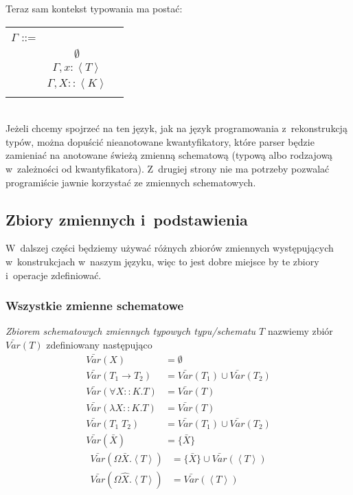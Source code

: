 \documentclass[11pt,leqno]{article}
\begin{document}
Teraz sam kontekst typowania ma postać:

\begin{tabular}{| l c r |}
  \hline
  $\Gamma$ ::= &  & \\
   & $\emptyset$ & \\
   & $\Gamma, x:\left<T\right>$ & \\
   & $\Gamma, X::\left<K\right>$ & \\
   & & \\
  \hline
\end{tabular} \\

Jeżeli chcemy spojrzeć na ten język, jak na język programowania z~rekonstrukcją typów, można
dopuścić nieanotowane kwantyfikatory, które parser będzie zamieniać na anotowane świeżą zmienną schematową 
(typową albo rodzajową w~zależności od kwantyfikatora). Z~drugiej strony nie ma potrzeby pozwalać programiście
jawnie korzystać ze zmiennych schematowych.

\subsection{Zbiory zmiennych i~podstawienia}

W~dalszej części będziemy używać różnych zbiorów zmiennych występujących w~konstrukcjach w~naszym języku, więc
to jest dobre miejsce by te zbiory i~operacje zdefiniować.

\subsubsection{Wszystkie zmienne schematowe}

\begin{definicja}
\emph{Zbiorem schematowych zmiennych typowych typu/schematu $T$} nazwiemy zbiór $\bar{Var}(T)$ zdefiniowany następująco
\begin{align*}
\bar{Var}(X) & = \emptyset \\
\bar{Var}(T_1 \to T_2) & = \bar{Var}(T_1) \cup \bar{Var}(T_2) \\
\bar{Var}(\forall X :: K.T) & = \bar{Var}(T) \\
\bar{Var}(\lambda X :: K.T) & = \bar{Var}(T) \\
\bar{Var}(T_1 \; T_2) & = \bar{Var}(T_1) \cup \bar{Var}(T_2) \\
\bar{Var}(\bar{X}) & = \{ \bar{X} \}
\end{align*}
\begin{align*}
\bar{Var}(\Omega \bar{X}.\left<T\right>) & = \{ \bar{X} \} \cup \bar{Var}(\left<T\right>) \\
\bar{Var}(\Omega \widehat{X}.\left<T\right>) & = \bar{Var}(\left<T\right>)
\end{align*}
\end{definicja}
\end{document}
